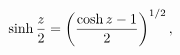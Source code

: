 \[\mathop{\sinh\/}\nolimits\frac{z}{2}=\left(\frac{\mathop{\cosh\/}\nolimits z-1%
}{2}\right)^{1/2},\]